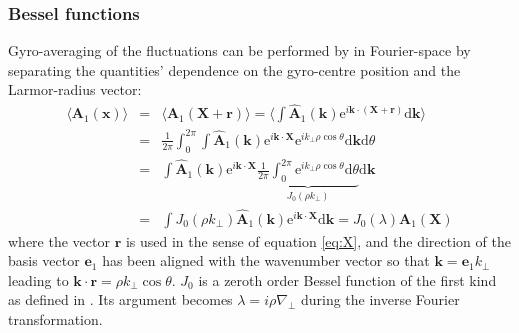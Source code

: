 \documentclass[a4paper,10pt]{article}
\newcommand{\st}[1]{\mathrm{#1}} %
\renewcommand{\vec}[1]{\mathbf{#1}}
\begin{document}
\subsubsection{Bessel functions}
Gyro-averaging of the fluctuations can be performed by in Fourier-space by separating the quantities' dependence on the gyro-centre position and the Larmor-radius vector:
\begin{eqnarray*}
 \langle \vec{A}_1(\vec{x}) \rangle &=& \langle \vec{A}_1 (\vec{X}+\vec{r}) \rangle = \langle \int \vec{\hat{A}}_1(\vec{k}) \st{e}^{i \vec{k} \cdot (\vec{X}+\vec{r})} \st{d}\vec{k} \rangle \\
 &=& \frac{1}{2 \pi} \int_0^{2 \pi} \int \vec{\hat{A}}_1(\vec{k}) \st{e}^{i \vec{k} \cdot \vec{X}} \st{e}^{i k_{\perp} \rho \cos \theta} \st{d} \vec{k} \st{d} \theta \\
 &=& \int \vec{\hat{A}}_1(\vec{k}) \st{e}^{i \vec{k} \cdot \vec{X}} \underbrace{\frac{1}{2 \pi} \int_0^{2 \pi} \st{e}^{i k_{\perp} \rho \cos \theta} \st{d} \theta}_{J_0(\rho k_{\perp})} \st{d} \vec{k} \\
 &=& \int J_0(\rho k_{\perp}) \vec{\hat{A}}_1(\vec{k}) \st{e}^{i \vec{k} \cdot \vec{X}} \st{d} \vec{k} = J_0(\lambda) \vec{A}_1(\vec{X})
\end{eqnarray*}
where the vector $\vec{r}$ is used in the sense of equation \ref{eq:X}, and the direction of the basis vector $\vec{e}_1$ has been aligned with the wavenumber vector so that $\vec{k}=\vec{e}_1 k_{\perp}$ leading to $\vec{k} \cdot \vec{r} = \rho k_{\perp} \cos \theta$. $J_0$ is a zeroth order Bessel function of the first kind as defined in \cite{a_and_s}. Its argument becomes $\lambda = i \rho \nabla_{\perp}$ during the inverse Fourier transformation. 
\end{document}
